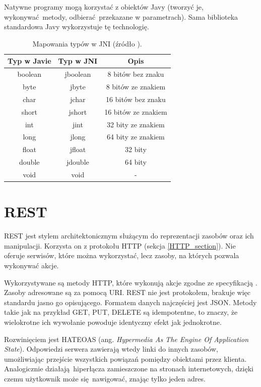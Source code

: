 Natywne programy mogą korzystać z obiektów Javy (tworzyć je, wykonywać metody, odbierać przekazane w parametrach). Sama biblioteka standardowa Javy wykorzystuje tę technologię.

\begin{table}[h!]
  \centering
  \begin{tabular}{|c|c|c|}
    \hline
    \textbf{Typ w Javie} & \textbf{Typ w JNI} & \textbf{Opis} \\ [0.5ex]
    \hline
    boolean & jboolean & 8 bitów bez znaku \\
    byte & jbyte & 8 bitów ze znakiem \\
    char & jchar & 16 bitów bez znaku \\
    short & jshort & 16 bitów ze znakiem \\
    int & jint & 32 bity ze znakiem \\
    long & jlong & 64 bity ze znakiem \\
    float & jfloat & 32 bity \\
    double & jdouble & 64 bity \\
    void & void & - \\ [1ex]
    \hline
  \end{tabular}
  \caption{Mapowania typów w JNI (źródło \cite{JNI17}).}
\end{table}


\section{REST}

REST jest stylem architektonicznym służącym do reprezentacji zasobów oraz ich manipulacji. Korzysta on z protokołu HTTP (sekcja \ref{HTTP_section}). Nie oferuje serwisów, które można wykorzystać, lecz zasoby, na których pozwala wykonywać akcje.

Wykorzystywane są metody HTTP, które wykonują akcje zgodne ze specyfikacją \cite{RFC7231}. Zasoby adresowane są za pomocą URI. REST nie jest protokołem, brakuje więc standardu jasno go opisującego. Formatem danych najczęściej jest JSON. Metody takie jak na przykład GET, PUT, DELETE są idempotentne, to znaczy, że wielokrotne ich wywołanie powoduje identyczny efekt jak jednokrotne.

Rozwinięciem jest HATEOAS (ang. \textit{Hypermedia As The Engine Of Application State}). Odpowiedzi serwera zawierają wtedy linki do innych zasobów, umożliwiając przejście wszystkich powiązań pomiędzy obiektami przez klienta. Analogicznie działają hiperłącza zamieszczone na stronach internetowych, dzięki czemu użytkownik może się nawigować, znając tylko jeden adres.


